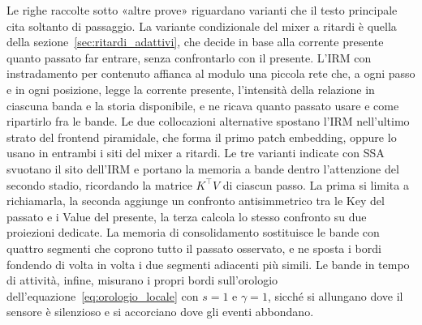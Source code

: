 Le righe raccolte sotto «altre prove» riguardano varianti che il testo principale cita soltanto di passaggio. La variante condizionale del mixer a ritardi è quella della sezione~\ref{sec:ritardi_adattivi}, che decide in base alla corrente presente quanto passato far entrare, senza confrontarlo con il presente. L'IRM con instradamento per contenuto affianca al modulo una piccola rete che, a ogni passo e in ogni posizione, legge la corrente presente, l'intensità della relazione in ciascuna banda e la storia disponibile, e ne ricava quanto passato usare e come ripartirlo fra le bande. Le due collocazioni alternative spostano l'IRM nell'ultimo strato del frontend piramidale, che forma il primo patch embedding, oppure lo usano in entrambi i siti del mixer a ritardi. Le tre varianti indicate con SSA svuotano il sito dell'IRM e portano la memoria a bande dentro l'attenzione del secondo stadio, ricordando la matrice $K^{\top}V$ di ciascun passo. La prima si limita a richiamarla, la seconda aggiunge un confronto antisimmetrico tra le Key del passato e i Value del presente, la terza calcola lo stesso confronto su due proiezioni dedicate. La memoria di consolidamento sostituisce le bande con quattro segmenti che coprono tutto il passato osservato, e ne sposta i bordi fondendo di volta in volta i due segmenti adiacenti più simili. Le bande in tempo di attività, infine, misurano i propri bordi sull'orologio dell'equazione~\eqref{eq:orologio_locale} con $s=1$ e $\gamma=1$, sicché si allungano dove il sensore è silenzioso e si accorciano dove gli eventi abbondano.

